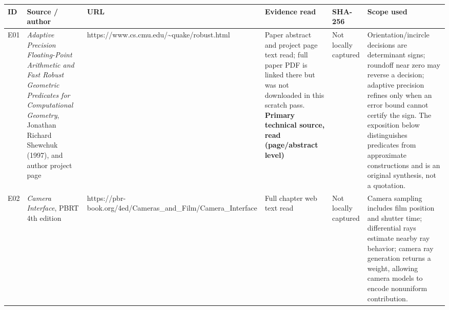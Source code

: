 {\def\LTcaptype{none} %
\begin{longtable}[]{@{}
  >{\raggedright\arraybackslash}p{}
  >{\raggedright\arraybackslash}p{}
  >{\raggedright\arraybackslash}p{}
  >{\raggedright\arraybackslash}p{}
  >{\raggedright\arraybackslash}p{}
  >{\raggedright\arraybackslash}p{}@{}}
\toprule\noalign{}
\begin{minipage}[b]{\linewidth}\raggedright
ID
\end{minipage} & \begin{minipage}[b]{\linewidth}\raggedright
Source / author
\end{minipage} & \begin{minipage}[b]{\linewidth}\raggedright
URL
\end{minipage} & \begin{minipage}[b]{\linewidth}\raggedright
Evidence read
\end{minipage} & \begin{minipage}[b]{\linewidth}\raggedright
SHA-256
\end{minipage} & \begin{minipage}[b]{\linewidth}\raggedright
Scope used
\end{minipage} \\
\midrule\noalign{}
\endhead
\bottomrule\noalign{}
\endlastfoot
E01 & \emph{Adaptive Precision Floating-Point Arithmetic and Fast Robust Geometric Predicates for Computational Geometry}, Jonathan Richard Shewchuk (1997), and author project page & https://www.cs.cmu.edu/\textasciitilde quake/robust.html & Paper abstract and project page text read; full paper PDF is linked there but was not downloaded in this scratch pass. \textbf{Primary technical source, read (page/abstract level)} & Not locally captured & Orientation/incircle decisions are determinant signs; roundoff near zero may reverse a decision; adaptive precision refines only when an error bound cannot certify the sign. The exposition below distinguishes predicates from approximate constructions and is an original synthesis, not a quotation. \\
E02 & \emph{Camera Interface}, PBRT 4th edition & https://pbr-book.org/4ed/Cameras\_and\_Film/Camera\_Interface & Full chapter web text read & Not locally captured & Camera sampling includes film position and shutter time; differential rays estimate nearby ray behavior; camera ray generation returns a weight, allowing camera models to encode nonuniform contribution. \\

\end{longtable}}
